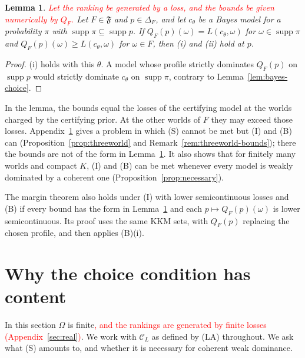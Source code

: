 \documentclass[11pt]{article}
\newtheorem{lemma}[theorem]{Lemma}
\theoremstyle{definition}
\theoremstyle{remark}
\newcommand{\C}{\mathcal C}
\newcommand{\F}{\mathfrak F}
\newcommand{\supp}{\operatorname{supp}}
\begin{document}
\begin{lemma}\label{lem:bayesbounds}
\textcolor{red}{Let the ranking be generated by a loss, and the bounds be given numerically by $Q_F$.} Let $F\in\F$ and $p\in\Delta_F$, and let $c_\theta$ be a Bayes model for a probability $\pi$ with $\supp\pi\subseteq\supp p$. If $Q_F(p)(\omega)=L(c_\theta,\omega)$ for $\omega\in\supp\pi$ and $Q_F(p)(\omega)\ge L(c_\theta,\omega)$ for $\omega\in F$, then (i) and (ii) hold at $p$.
\end{lemma}
\begin{proof}
(i) holds with this $\theta$. A model whose profile strictly dominates $Q_F(p)$ on $\supp p$ would strictly dominate $c_\theta$ on $\supp\pi$, contrary to Lemma~\ref{lem:bayes-choice}.
\end{proof}
In the lemma, the bounds equal the losses of the certifying model at the worlds charged by the certifying prior. At the other worlds of $F$ they may exceed those losses. Appendix~\ref{sec:finite} gives a problem in which (S) cannot be met but (I) and (B) can (Proposition~\ref{prop:threeworld} and Remark~\ref{rem:threeworld-bounds}); there the bounds are not of the form in Lemma~\ref{lem:bayesbounds}. It also shows that for finitely many worlds and compact $K$, (I) and (B) can be met whenever every model is weakly dominated by a coherent one (Proposition~\ref{prop:necessary}).


The margin theorem also holds under (I) with lower semicontinuous losses and (B) if every bound has the form in Lemma~\ref{lem:bayesbounds} and each $p\mapsto Q_F(p)(\omega)$ is lower semicontinuous. Its proof uses the same KKM sets, with $Q_F(p)$ replacing the chosen profile, and then applies (B)(i).

\section{Why the choice condition has content}\label{sec:finite}
In this section $\Omega$ is finite\textcolor{red}{, and the rankings are generated by finite losses (Appendix~\ref{sec:real})}. We work with $\C_L$ as defined by (LA) throughout. We ask what (S) amounts to, and whether it is necessary for coherent weak dominance.
\end{document}
